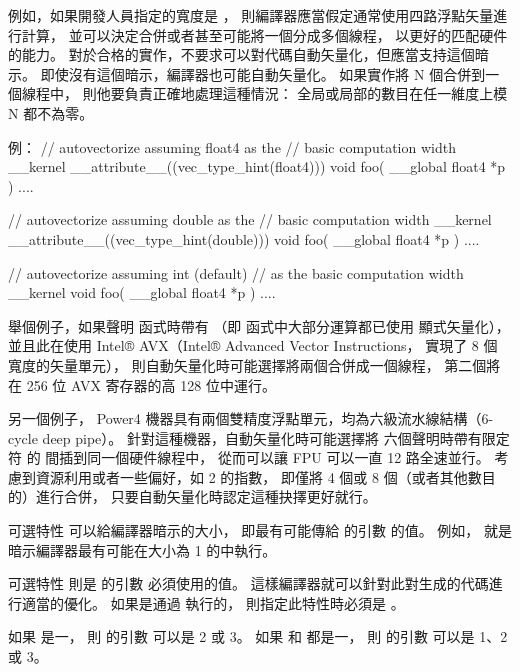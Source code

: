 例如，如果開發人員指定的寬度是 ，
則編譯器應當假定通常使用四路浮點矢量進行計算，
並可以決定合併或者甚至可能將一個分成多個線程，
以更好的匹配硬件的能力。
對於合格的實作，不要求可以對代碼自動矢量化，但應當支持這個暗示。
即使沒有這個暗示，編譯器也可能自動矢量化。
如果實作將 N 個合併到一個線程中，
則他要負責正確地處理這種情況：
全局或局部的數目在任一維度上模 N 都不為零。

例：
\startclc
// autovectorize assuming float4 as the
// basic computation width
__kernel __attribute__((vec_type_hint(float4)))
void foo( __global float4 *p ) { .... }

// autovectorize assuming double as the
// basic computation width
__kernel __attribute__((vec_type_hint(double)))
void foo( __global float4 *p ) { .... }

// autovectorize assuming int (default)
// as the basic computation width
__kernel
void foo( __global float4 *p ) { .... }
\stopclc

舉個例子，如果聲明  函式時帶有
 （即  函式中大部分運算都已使用  顯式矢量化），
並且此在使用
 Intel® AVX（Intel® Advanced Vector Instructions，
實現了 8 個  寬度的矢量單元），
則自動矢量化時可能選擇將兩個合併成一個線程，
第二個將在 256 位 AVX 寄存器的高 128 位中運行。

另一個例子， Power4 機器具有兩個雙精度浮點單元，均為六級流水線結構（6-cycle deep pipe）。
針對這種機器，自動矢量化時可能選擇將
六個聲明時帶有限定符  的
間插到同一個硬件線程中，
從而可以讓 FPU 可以一直 12 路全速並行。
考慮到資源利用或者一些偏好，如 2 的指數，
即僅將 4 個或 8 個（或者其他數目的）進行合併，
只要自動矢量化時認定這種抉擇更好就行。

可選特性 
 可以給編譯器暗示的大小，
即最有可能傳給  的引數  的值。
例如， 
 就是暗示編譯器最有可能在大小為 1 的中執行。

可選特性 
 則是  的引數  必須使用的值。
這樣編譯器就可以針對此對生成的代碼進行適當的優化。
如果是通過  執行的，
則指定此特性時必須是 。

如果  是一，
則  的引數  可以是 2 或 3。
如果  和  都是一，
則  的引數  可以是 1、2 或 3。

